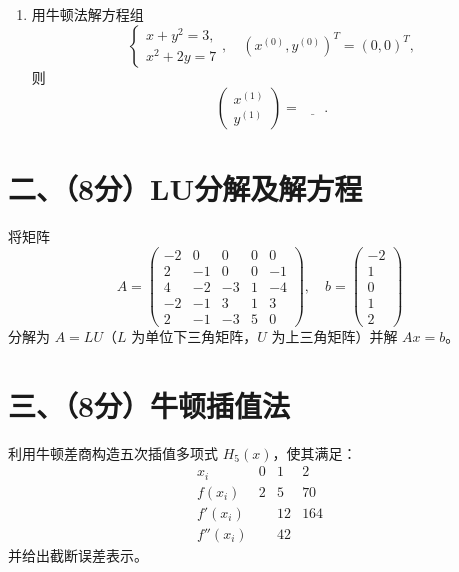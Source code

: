 \documentclass[12pt,a4paper]{article}
\newcommand{\blank}[1]{\underline{\hspace{#1}}}
\begin{document}
\begin{enumerate}[leftmargin=*,itemsep=1.5ex]
		\[
		\begin{cases}
			x + f(x,y) = 0,\\
			\ln x - y = 0
		\end{cases}
		\]
		的简单迭代格式为\blank{30pt}，Gauss--Seidel 迭代格式为\blank{30pt}；
		\item 用牛顿法解方程组
		\[
		\begin{cases}
			x + y^2 = 3,\\
			x^2 + 2y = 7
		\end{cases},
		\quad (x^{(0)},y^{(0)})^T=(0,0)^T,
		\]
		则
		\[
		\begin{pmatrix}x^{(1)}\\y^{(1)}\end{pmatrix}
		= \blank{20pt}.
		\]
	\end{enumerate}
	
	\newpage
	\section*{二、（8分）LU分解及解方程}
	将矩阵
	\[
	A=\begin{pmatrix}
		-2&0&0&0&0\\
		2&-1&0&0&-1\\
		4&-2&-3&1&-4\\
		-2&-1&3&1&3\\
		2&-1&-3&5&0
	\end{pmatrix},\quad
	b=\begin{pmatrix}-2\\1\\0\\1\\2\end{pmatrix}
	\]
	分解为 $A=LU$（$L$ 为单位下三角矩阵，$U$ 为上三角矩阵）并解 $Ax=b$。
	
	\vspace{20cm}
	
	\newpage
	\section*{三、（8分）牛顿插值法}
	利用牛顿差商构造五次插值多项式 $H_5(x)$，使其满足：
	\[
	\begin{array}{c|ccc}
		x_i & 0 & 1 & 2\\\hline
		f(x_i) & 2 & 5 & 70\\\hline
		f'(x_i)&   &12&164\\\hline
		f''(x_i)&  &42&
	\end{array}
	\]
	并给出截断误差表示。
	
\end{document}
